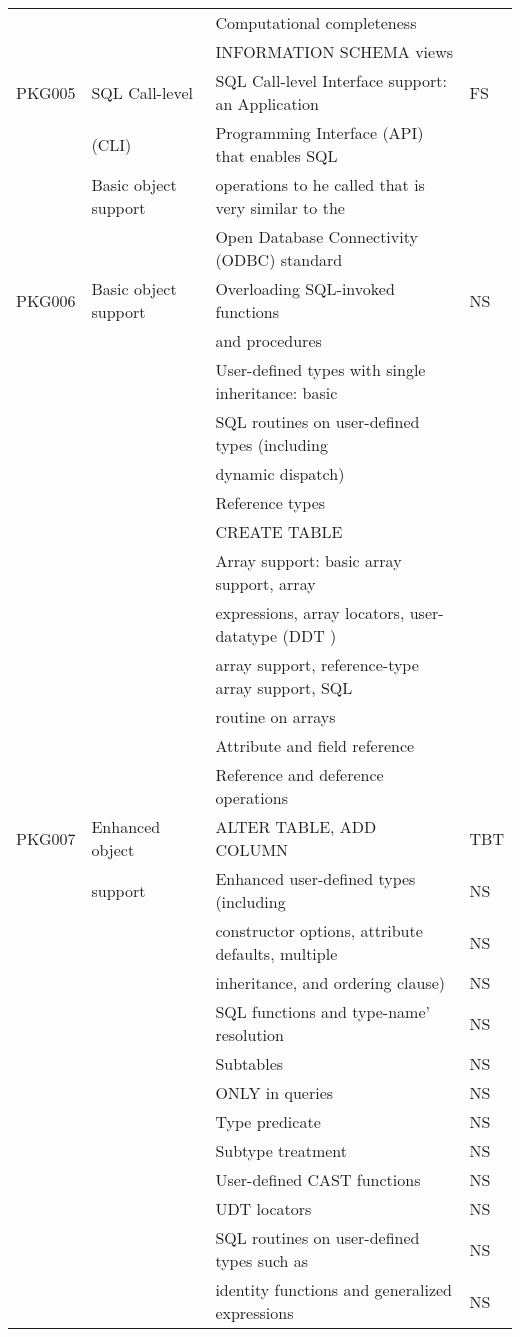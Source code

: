 \documentclass[10pt,twocolumn,fleqn]{article}
\begin{document}
\begin{tabular}{l | l | l| l |}
	&	 	&Computational completeness	& \\
	&	 	&INFORMATION SCHEMA views	& \\\hline
PKG005	&SQL Call-level	&SQL Call-level Interface support: an Application	& FS\\
&(CLI)	&Programming Interface (API) that enables SQL	& \\
	&Basic object support	&operations to he called that is very similar to the	& \\
	&	 & Open Database Connectivity (ODBC) standard	& \\\hline
PKG006	&Basic object support&Overloading SQL-invoked functions & NS\\
	&		& and procedures	& \\
	&	 	&User-defined types with single inheritance: basic	& \\
	&	&SQL routines on user-defined types (including	& \\
	&	&dynamic dispatch)	& \\
	&	 	&Reference types	& \\
	&	 	&CREATE TABLE	& \\
	&	 	&Array support: basic array support, array	& \\
	&	&expressions, array locators, user-datatype (DDT )	& \\
	&	&array support, reference-type array support, SQL	& \\
	&	&routine on arrays	& \\
	&	 	&Attribute and field reference	& \\
	&	 	&Reference and deference operations	& \\\hline
PKG007	& Enhanced object&ALTER TABLE, ADD COLUMN	& TBT \\
	& support	&Enhanced user-defined types (including	& NS\\
	&	&constructor options, attribute defaults, multiple	& NS\\
	&	&inheritance, and ordering clause)	& NS \\
	&	 	&SQL functions and type-name' resolution	& NS \\
	&	 	&Subtables	& NS \\
	&	 	&ONLY in queries	& NS \\
	&	 	&Type predicate	& NS \\
	&	 	&Subtype treatment	& NS \\
	&	 	&User-defined CAST functions	& NS \\
	&	 	&UDT locators	& NS \\
	&	 	&SQL routines on user-defined types such as	& NS \\
	&	&identity functions and generalized expressions	& NS \\
\end{tabular}	
\end{document}
